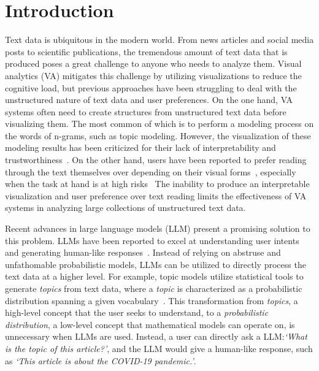 \section{Introduction}
Text data is ubiquitous in the modern world. 
From news articles and social media posts to scientific publications, the tremendous amount of text data that is produced poses a great challenge to anyone who needs to analyze them.
Visual analytics (VA) mitigates this challenge by utilizing visualizations to reduce the cognitive load, but previous approaches have been struggling to deal with the unstructured nature of text data and user preferences.
On the one hand, VA systems often need to create structures from unstructured text data before visualizing them.
The most common of which is to perform a modeling process on the words of n-grams, such as topic modeling.
However, the visualization of these modeling results has been criticized for their lack of interpretability and trustworthiness~\cite{lee2017humantopicmodel, chuang2012interpretation}. 
On the other hand, users have been reported to prefer reading through the text themselves over depending on their visual forms~\cite{lee2017humantopicmodel}, especially when the task at hand is at high risks~\cite{sultanum2022chartwalk}
The inability to produce an interpretable visualization and user preference over text reading limits the effectiveness of VA systems in analyzing large collections of unstructured text data.

Recent advances in large language models (LLM) present a promising solution to this problem.
LLMs have been reported to excel at understanding user intents and generating human-like responses~\cite{li2023evaluateChatgpt}.
Instead of relying on abstruse and unfathomable probabilistic models, LLMs can be utilized to directly process the text data at a higher level.
For example, topic models utilize statistical tools to generate \textit{topics} from text data, where a \textit{topic} is characterized as a probabilistic distribution spanning a given vocabulary~\cite{vayansky2020review}.
This transformation from \textit{topics}, a high-level concept that the user seeks to understand, to a \textit{probabilistic distribution}, a low-level concept that mathematical models can operate on, is unnecessary when LLMs are used.
Instead, a user can directly ask a LLM:\@ \textit{`What is the topic of this article?'}, and the LLM would give a human-like response, such as \textit{`This article is about the COVID-19 pandemic.'}.

